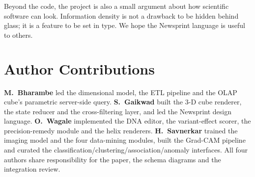 \documentclass[conference,10pt]{IEEEtran}
\begin{document}
Beyond the code, the project is also a small argument about how
scientific software can look. Information density is not a drawback to
be hidden behind glass; it is a feature to be set in type. We hope the
Newsprint language is useful to others.

\section*{Author Contributions}
\textbf{M.~Bharambe} led the dimensional model, the ETL pipeline and the
OLAP cube's parametric server-side query. \textbf{S.~Gaikwad} built the
3-D cube renderer, the state reducer and the cross-filtering layer, and
led the Newsprint design language. \textbf{O.~Wagale} implemented the DNA
editor, the variant-effect scorer, the precision-remedy module and the
helix renderers. \textbf{H.~Savnerkar} trained the imaging model and the
four data-mining modules, built the Grad-CAM pipeline and curated the
classification/clustering/association/anomaly interfaces. All four
authors share responsibility for the paper, the schema diagrams and the
integration review.
\end{document}
